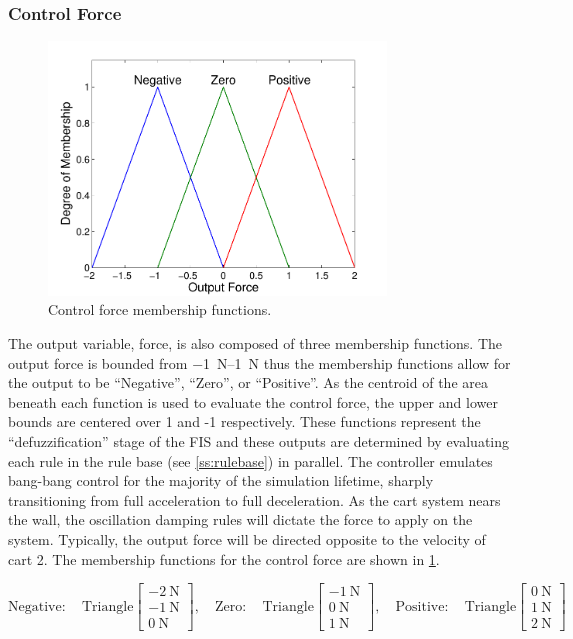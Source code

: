 \subsubsection{Control Force}
\begin{figure}[h]
    \centering
    \includegraphics[width=0.8\textwidth]{images/f_mfs.pdf}
    \caption{Control force membership functions.}
    \label{f:fmfs}
\end{figure}
The output variable, force, is
also composed of three membership functions. The output force is bounded from \SIrange{-1}{1}{\newton} thus
the membership functions allow for the output to be ``Negative'', ``Zero'', or ``Positive''. As the centroid
of the area beneath each function is used to evaluate the control force, the upper and lower bounds are
centered over 1 and -1 respectively. These functions represent the ``defuzzification'' stage of the FIS and
these outputs are determined by evaluating each rule in the rule base (see \cref{ss:rulebase}) in
parallel\cite{matlab:12tb}. The controller emulates bang-bang control for the majority of the simulation
lifetime, sharply transitioning from full acceleration to full deceleration. As the cart system nears the
wall, the oscillation damping rules will dictate the force to apply on the system. Typically, the output force
will be directed opposite to the velocity of cart 2. The membership functions for the control force are shown
in \cref{f:fmfs}.
	
	


\begin{displaymath} \mathrm{Negative:}\quad \mathrm{Triangle}\begin{bmatrix}
\SI{-2}{\newton}\\\SI{-1}{\newton}\\\SI{0}{\newton} \end{bmatrix}, \quad \mathrm{Zero:}\quad
\mathrm{Triangle}\begin{bmatrix} \SI{-1}{\newton}\\\SI{0}{\newton}\\\SI{1}{\newton} \end{bmatrix}, \quad
    \mathrm{Positive:}\quad \mathrm{Triangle}\begin{bmatrix} \SI{0}{\newton}\\\SI{1}{\newton}\\\SI{2}{\newton}
    \end{bmatrix} \end{displaymath}

